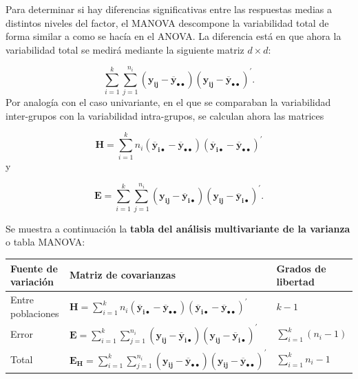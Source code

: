 \documentclass[
  a4paper,
  oneside]{scrbook}
\newcounter{none} %
\theoremstyle{definition}
\theoremstyle{definition}
\theoremstyle{definition}
\theoremstyle{definition}
\theoremstyle{remark}
\begin{document}
Para determinar si hay diferencias significativas entre las respuestas
medias a distintos niveles del factor, el MANOVA descompone la
variabilidad total de forma similar a como se hacía en el ANOVA. La
diferencia está en que ahora la variabilidad total se medirá mediante la
siguiente matriz \(d\times d\):

\[\sum_{i=1}^k \sum_{j=1}^{n_i}
\left( \bm{y_{ij}}-\bm{\overline{y}_{\bullet\bullet}}\right)
\left( \bm{y_{ij}}-\bm{\overline{y}_{\bullet\bullet}}\right)^\prime{}.\]
Por analogía con el caso univariante, en el que se comparaban la
variabilidad inter-grupos con la variabilidad intra-grupos, se calculan
ahora las matrices

\[\bm{H}=\sum_{i=1}^kn_i(\bm{\overline{y}_{i\bullet}}-\bm{\overline{y}_{\bullet\bullet}})(\bm{\overline{y}_{i\bullet}}-\bm{\overline{y}_{\bullet\bullet}})^\prime{}\]
y

\[\bm{E} = \sum_{i=1}^k \sum_{j=1}^{n_i}
\left( \bm{y_{ij}}- \bm{\overline{y}_{i\bullet}}\right)
\left( \bm{y_{ij}}- \bm{\overline{y}_{i\bullet}}\right)^\prime{}.\]

Se muestra a continuación la \textbf{tabla del análisis multivariante de la
varianza} o tabla MANOVA:

{\def\LTcaptype{none} %
\begin{longtable}[]{@{}
  >{\centering\arraybackslash}p{}
  >{\centering\arraybackslash}p{}
  >{\centering\arraybackslash}p{}@{}}
\toprule\noalign{}
\begin{minipage}[b]{\linewidth}\centering
Fuente de variación
\end{minipage} & \begin{minipage}[b]{\linewidth}\centering
Matriz de covarianzas
\end{minipage} & \begin{minipage}[b]{\linewidth}\centering
Grados de libertad
\end{minipage} \\
\midrule\noalign{}
\endhead
\bottomrule\noalign{}
\endlastfoot
Entre poblaciones & \({ \bm{H}=\sum_{i=1}^kn_i(\bm{\overline{y}_{i\bullet}}-\bm{\overline{y}_{\bullet\bullet}})(\bm{\overline{y}_{i\bullet}}-\bm{\overline{y}_{\bullet\bullet}})^\prime{}}\) & \(k-1\) \\
Error & \({\bm{E} = \sum_{i=1}^k \sum_{j=1}^{n_i}\left( \bm{y_{ij}}- \bm{\overline{y}_{i\bullet}}\right)\left( \bm{y_{ij}}- \bm{\overline{y}_{i\bullet}}\right)^\prime{}}\) & \({\sum_{i=1}^k \left(n_i-1\right)}\) \\
Total & \({\bm{E_H} = \sum_{i=1}^k \sum_{j=1}^{n_i}\left( \bm{y_{ij}}-\bm{\overline{y}_{\bullet\bullet}}\right)\left( \bm{y_{ij}}-\bm{\overline{y}_{\bullet\bullet}}\right)^\prime{}}\) & \({\sum_{i=1}^k n_i-1}\) \\
\end{longtable}
}
\end{document}
